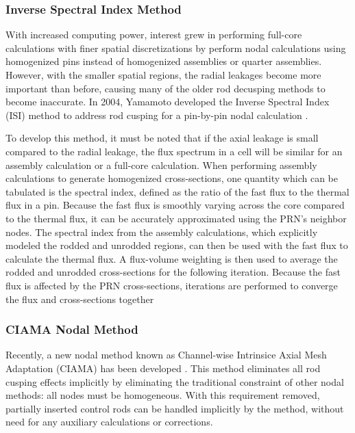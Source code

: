 \subsubsection{Inverse Spectral Index Method}

With increased computing power, interest grew in performing full-core calculations with finer spatial discretizations by perform nodal calculations using homogenized pins instead of homogenized assemblies or quarter assemblies.  However, with the smaller spatial regions, the radial leakages become more important than before, causing many of the older rod decusping methods to become inaccurate.  In 2004, Yamamoto developed the Inverse Spectral Index (ISI) method to address rod cusping for a pin-by-pin nodal calculation \cite{yamamoto2004pinByPinNodalDecusping}.

To develop this method, it must be noted that if the axial leakage is small compared to the radial leakage, the flux spectrum in a cell will be similar for an assembly calculation or a full-core calculation.  When performing assembly calculations to generate homogenized cross-sections, one quantity which can be tabulated is the spectral index, defined as the ratio of the fast flux to the thermal flux in a pin.  Because the fast flux is smoothly varying across the core compared to the thermal flux, it can be accurately approximated using the PRN's neighbor nodes.  The spectral index from the assembly calculations, which explicitly modeled the rodded and unrodded regions, can then be used with the fast flux to calculate the thermal flux.  A flux-volume weighting is then used to average the rodded and unrodded cross-sections for the following iteration.  Because the fast flux is affected by the PRN cross-sections, iterations are performed to converge the flux and cross-sections together

\subsubsection{CIAMA Nodal Method}

Recently, a new nodal method known as Channel-wise Intrinsice Axial Mesh Adaptation (CIAMA) has been developed \cite{yu2015CIAMArodDecusping,lu2015CIAMAintro}.  This method eliminates all rod cusping effects implicitly by eliminating the traditional constraint of other nodal methods: all nodes must be homogeneous.  With this requirement removed, partially inserted control rods can be handled implicitly by the method, without need for any auxiliary calculations or corrections.

